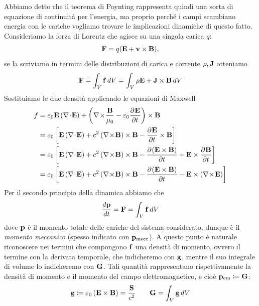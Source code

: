 Abbiamo detto che il teorema di Poynting rappresenta quindi una sorta di equazione di continuità per l'energia, ma proprio perché i campi scambiano energia 
con le cariche vogliamo trovare le implicazioni dinamiche di questo fatto. 
Consideriamo la forza di Lorentz che agisce su una singola carica $ q $:
\begin{align}
  \mathbf{ F } = q(\mathbf{ E } + \mathbf{ v \times B}),
\end{align}
se la scriviamo in termini delle distribuzioni di carica e corrente $ \rho, \mathbf{ J } $ otteniamo
\begin{align}
  \mathbf{ F } = \int_V \mathbf{ f } \,dV = \int_V \rho\mathbf{ E } + \mathbf{ J \times B } \,dV
\end{align}
Sostituiamo le due densità applicando le equazioni di Maxwell
\begin{align}
  f &= \eps_0 \v{ E } \left( \nabla\!\cdot\!\v{ E } \right) + \left( \nabla\!\times\!\frac{\v{ B }}{\mu_0} - \eps_0 \der{\v{ E }}{t} \right) \times \v{ B }
  \\
  &= \eps_0 \left[ \v{ E } \left( \nabla\!\cdot\!\v{ E } \right) + c^2 \left( \nabla\!\times\!\v{ B } \right) \times \v{ B } 
  -  \der{\v{ E }}{t} \times \v{ B } \right]
  \\
  &= \eps_0 \left[ \v{ E } \left( \nabla\!\cdot\!\v{ E } \right) + c^2 \left( \nabla\!\times\!\v{ B } \right) \times \v{ B } 
  - \der{\v{ \left( E \times B \right)}}{t} + \v{ E } \times \der{\v{ B }}{t} \right]
  \\
  &= \eps_0 \left[ \v{ E } \left( \nabla\!\cdot\!\v{ E } \right) + c^2 \left( \nabla\!\times\!\v{ B } \right) \times \v{ B } 
  - \der{\v{ \left( E \times B \right)}}{t} - \v{ E } \times \left( \nabla\!\times\!\v{ E } \right) \right]
\end{align}
Per il secondo principio della dinamica abbiamo che
\begin{align}
  \frac{d\mathbf{p}}{dt} = \mathbf{F} = \int_V \mathbf{f} \,dV 
\end{align}
dove $ \mathbf{p} $ è il momento totale delle cariche del sistema considerato, dunque è il \textit{momento meccanico} 
(spesso indicato con $ \mathbf{p}_{\text{mecc}} $). A questo punto è naturale riconoscere nei termini che compongono $ \mathbf{f} $ una densità di momento,  
ovvero il termine con la derivata temporale, che indicheremo con $ \mathbf{g} $, mentre il suo integrale di volume lo indicheremo con $ \mathbf{G} $. 
Tali quantità rappresentano rispettivamente la densità di momento e il momento del campo elettromagnetico, e cioè $ \mathbf{p}_{\text{em}} \coloneq \mathbf{G}  $: 
\begin{align}
  \mathbf{g} \coloneq \varepsilon_0 \left( \mathbf{E \times B} \right) = \frac{\mathbf{S}}{c^2} \qquad \mathbf{G} = \int_V \mathbf{g} \,dV
\end{align}

